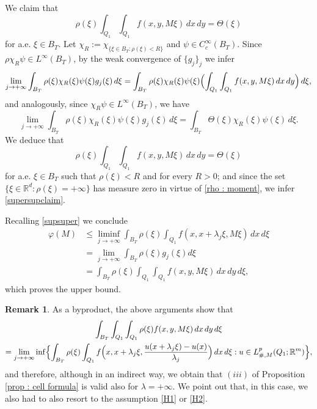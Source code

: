 \documentclass{article}
\theoremstyle{definition}
\newtheorem{remark}[lemma]{Remark}
\newcommand{\f}{\varphi}
\newcommand{\R}{\mathbb{R}}
\begin{document}
We claim that
\begin{equation}\label{supersupclaim}
   \rho(\xi) \int_{Q_1} \int_{Q_1} f(x,y,M\xi)\, dx\, dy=  \Theta(\xi)
   \end{equation}
for a.e. $\xi\in B_T$. Let $\chi_R:=\chi_{\{\xi\in B_T: \rho(\xi)<R\}}$ and $\psi\in C^\infty_c(B_T)$. Since $\rho\chi_R\psi\in L^\infty(B_T)$, by the weak convergence of $\{g_j\}_j$ we infer
\begin{equation*}
    \lim_{j\to+\infty} \int_{B_T}\rho(\xi)\chi_R(\xi)\psi(\xi)g_j(\xi)\,d\xi = \int_{B_T}\rho(\xi)\chi_R(\xi)\psi(\xi)\Bigl(\int_{Q_1} \int_{Q_1} f(x,y,M\xi)\, dx\, dy\Bigr)\,d\xi,
\end{equation*}
and analogously, since $\chi_R\psi\in L^\infty(B_T)$, we have
\begin{equation*}
    \lim_{j\to+\infty} \int_{B_T}\rho(\xi)\chi_R(\xi)\psi(\xi)g_j(\xi)\,d\xi = \int_{B_T}\Theta(\xi)\chi_R(\xi)\psi(\xi)\,d\xi.
\end{equation*}
We deduce that 
\begin{equation*}
   \rho(\xi)\int_{Q_1} \int_{Q_1} f(x,y,M\xi)\, dx\, dy= \Theta(\xi)
\end{equation*}
for a.e. $\xi\in B_T$ such that $\rho(\xi)<R$ and for every $R>0$; and since the set $\{\xi\in \R^d:\rho(\xi)=+\infty\}$ has measure zero in virtue of \eqref{rho : moment}, we infer \eqref{supersupclaim}.

Recalling \eqref{supsuper} we conclude
\begin{align*}
    \f(M) & \leq \liminf_{j\to+\infty}  \int_{B_T} \rho(\xi)\int_{Q_1} f(x,x+\lambda_j\xi,M\xi)\, dx\,d\xi \\
    & = \lim_{j\to+\infty}  \int_{B_T} \rho(\xi)g_j(\xi)d\xi \\
    & = \int_{B_T}\rho(\xi)\int_{Q_1} \int_{Q_1} f(x,y,M\xi)\, dx\, dy\,d\xi,
\end{align*}
which proves the upper bound.

\begin{remark}\label{rmk super} 
As a byproduct, the above arguments show that
\begin{multline*}
    \int_{B_T}\int_{Q_1} \int_{Q_1} \rho(\xi) f(x,y,M\xi)\, dx\, dy\,d\xi \\ = \lim_{j\to+\infty} \inf\Bigl\{ \int_{B_T} \rho(\xi)\int_{Q_1} f\Bigl(x,x+\lambda_j\xi,\frac{u(x+\lambda_j\xi)-u(x)}{\lambda_j}\Bigr)\, dx\,d\xi : u\in L^p_{\#,M}(Q_1;\R^m) \Bigr\},
\end{multline*}
and therefore, although in an indirect way, we obtain that $(iii)$ of Proposition \ref{prop : cell formula} is valid also for $\lambda=+\infty$. We point out that, in this case, we also had to also resort to the assumption \eqref{H1} or \eqref{H2}.
\end{remark}
\end{document}
